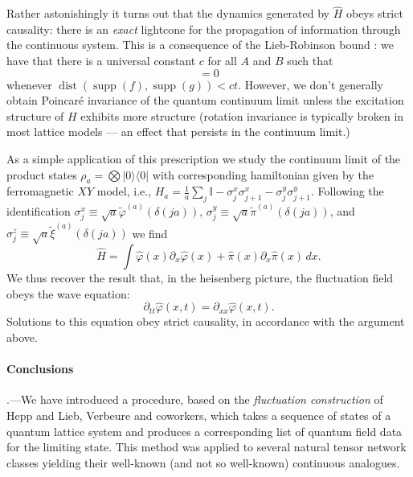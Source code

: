 \documentclass[prl,twocolumn,lengthcheck,superscriptaddress]{revtex4-1}
\newcommand{\supp}{\operatorname{supp}}
\newcommand{\dist}{\operatorname{dist}}
\theoremstyle{definition}
\theoremstyle{remark}
\begin{document}
Rather astonishingly it turns out that the dynamics generated by $\widehat{H}$ obeys strict causality: there is an \emph{exact} lightcone for the propagation of information through the continuous system. This is a consequence of the Lieb-Robinson bound  \cite{lieb:1972a,bratteli:1997a,nachtergaele:2010b}: we have that there is a universal constant $c$ for all $A$ and $B$ such that
\begin{equation}
	[\widehat{\phi}(f), e^{-it\widehat{H}} \widehat{\phi}(g)e^{it\widehat{H}} ] = 0
\end{equation}
whenever $\dist(\supp(f) , \supp(g)) < ct$. However, we don't generally obtain Poincar\'e invariance of the quantum continuum limit unless the excitation structure of $H$ exhibits more structure (rotation invariance is typically broken in most lattice models --- an effect that persists in the continuum limit.) 

As a simple application of this prescription we study the continuum limit of the product states $\rho_a = \bigotimes |0\rangle\langle 0|$ with corresponding hamiltonian given by the ferromagnetic $XY$ model, i.e., $H_a = \frac{1}{a}\sum_{j} \mathbb{I} - \sigma^x_j\sigma_{j+1}^x - \sigma^y_j\sigma_{j+1}^y$. Following the identification $\sigma^x_j \equiv \sqrt{a}\widetilde{\varphi}^{(a)}(\delta(ja))$, $\sigma^y_j \equiv \sqrt{a}\widetilde{\pi}^{(a)}(\delta(ja))$, and $\sigma^z_j \equiv \sqrt{a}\widetilde{\xi}^{(a)}(\delta(ja))$ we find
\begin{equation}
	\widehat{H} = \int \widehat{\varphi}(x) \partial_x\widehat{\varphi}(x) + \widehat{\pi}(x) \partial_x\widehat{\pi}(x) \, dx.
\end{equation}
We thus recover the result that, in the heisenberg picture, the fluctuation field obeys the wave equation:
\begin{equation}
	\partial_{tt}\widehat{\varphi}(x,t) = \partial_{xx}\widehat{\varphi}(x,t).
\end{equation}
Solutions to this equation obey strict causality, in accordance with the argument above.

\paragraph*{Conclusions}\hspace{-1em}.---We have introduced a procedure, based on the \emph{fluctuation construction} of Hepp and Lieb, Verbeure and coworkers, which takes a sequence of states of a quantum lattice system and produces a corresponding list of quantum field data for the limiting state. This method was applied to several natural tensor network classes yielding their well-known (and not so well-known) continuous analogues. 
\end{document}
